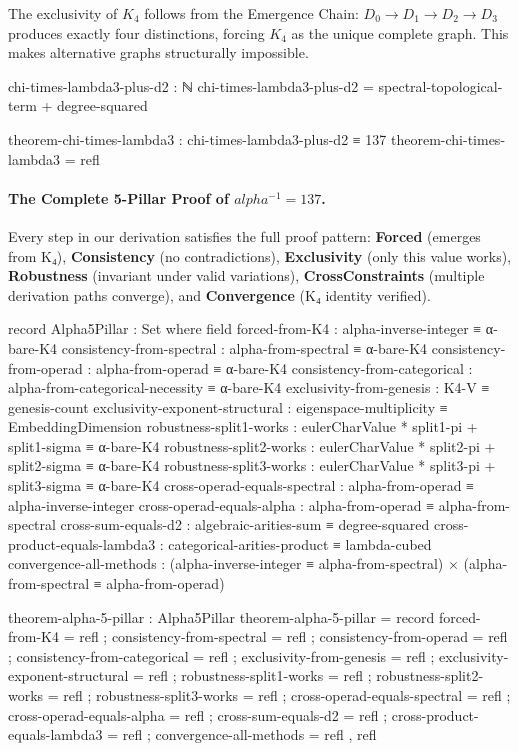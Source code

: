 \documentclass[11pt,a4paper]{book}
\def\alpha{alpha}%
\begin{document}
The exclusivity of $K_4$ follows from the Emergence Chain: $D_0 \to D_1 \to D_2 \to D_3$ produces exactly
four distinctions, forcing $K_4$ as the unique complete graph. This makes alternative graphs structurally impossible.

\begin{code}
chi-times-lambda3-plus-d2 : ℕ
chi-times-lambda3-plus-d2 = spectral-topological-term + degree-squared

theorem-chi-times-lambda3 : chi-times-lambda3-plus-d2 ≡ 137
theorem-chi-times-lambda3 = refl
\end{code}

\paragraph{The Complete 5-Pillar Proof of $\alpha^{-1} = 137$.}

Every step in our derivation satisfies the full proof pattern:
\textbf{Forced} (emerges from K₄),
\textbf{Consistency} (no contradictions), 
\textbf{Exclusivity} (only this value works),
\textbf{Robustness} (invariant under valid variations),
\textbf{CrossConstraints} (multiple derivation paths converge), and
\textbf{Convergence} (K₄ identity verified).

\begin{code}
record Alpha5Pillar : Set where
  field
    forced-from-K4               : alpha-inverse-integer ≡ α-bare-K4
    consistency-from-spectral      : alpha-from-spectral ≡ α-bare-K4
    consistency-from-operad        : alpha-from-operad ≡ α-bare-K4
    consistency-from-categorical   : alpha-from-categorical-necessity ≡ α-bare-K4
    exclusivity-from-genesis       : K4-V ≡ genesis-count
    exclusivity-exponent-structural : eigenspace-multiplicity ≡ EmbeddingDimension
    robustness-split1-works        : eulerCharValue * split1-pi + split1-sigma ≡ α-bare-K4
    robustness-split2-works        : eulerCharValue * split2-pi + split2-sigma ≡ α-bare-K4
    robustness-split3-works        : eulerCharValue * split3-pi + split3-sigma ≡ α-bare-K4
    cross-operad-equals-spectral   : alpha-from-operad ≡ alpha-inverse-integer
    cross-operad-equals-alpha      : alpha-from-operad ≡ alpha-from-spectral
    cross-sum-equals-d2            : algebraic-arities-sum ≡ degree-squared
    cross-product-equals-lambda3   : categorical-arities-product ≡ lambda-cubed
    convergence-all-methods        : (alpha-inverse-integer ≡ alpha-from-spectral) × (alpha-from-spectral ≡ alpha-from-operad)

theorem-alpha-5-pillar : Alpha5Pillar
theorem-alpha-5-pillar = record
  { forced-from-K4             = refl
  ; consistency-from-spectral    = refl
  ; consistency-from-operad      = refl
  ; consistency-from-categorical = refl
  ; exclusivity-from-genesis     = refl
  ; exclusivity-exponent-structural = refl
  ; robustness-split1-works      = refl
  ; robustness-split2-works      = refl
  ; robustness-split3-works      = refl
  ; cross-operad-equals-spectral = refl
  ; cross-operad-equals-alpha    = refl
  ; cross-sum-equals-d2          = refl
  ; cross-product-equals-lambda3 = refl
  ; convergence-all-methods      = refl , refl
  }
\end{code}
\end{document}
